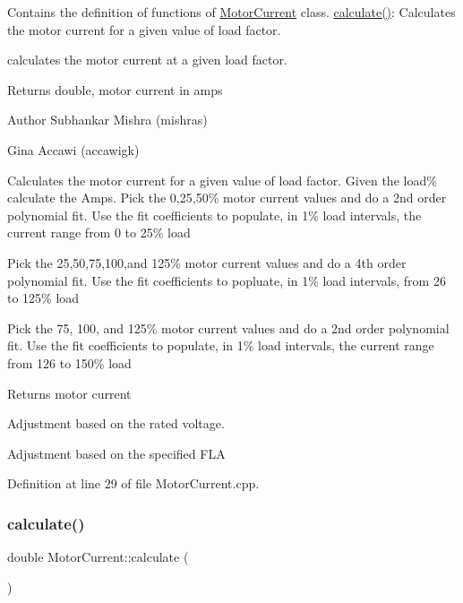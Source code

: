 Contains the definition of functions of \hyperlink{class_motor_current}{Motor\+Current} class. \hyperlink{class_motor_current_a18e545d2c82f1fe247cc501eda2ce857}{calculate()}\+: Calculates the motor current for a given value of load factor. 

calculates the motor current at a given load factor. \begin{DoxyReturn}{Returns}
double, motor current in amps
\end{DoxyReturn}
\begin{DoxyAuthor}{Author}
Subhankar Mishra (mishras) 

Gina Accawi (accawigk) 
\end{DoxyAuthor}
Calculates the motor current for a given value of load factor. Given the load\% calculate the Amps. Pick the 0,25,50\% motor current values and do a 2nd order polynomial fit. Use the fit coefficients to populate, in 1\% load intervals, the current range from 0 to 25\% load

Pick the 25,50,75,100,and 125\% motor current values and do a 4th order polynomial fit. Use the fit coefficients to popluate, in 1\% load intervals, from 26 to 125\% load

Pick the 75, 100, and 125\% motor current values and do a 2nd order polynomial fit. Use the fit coefficients to populate, in 1\% load intervals, the current range from 126 to 150\% load \begin{DoxyReturn}{Returns}
motor current 
\end{DoxyReturn}
Adjustment based on the rated voltage.

Adjustment based on the specified F\+LA 

Definition at line 29 of file Motor\+Current.\+cpp.

\mbox{\label{class_motor_current_a18e545d2c82f1fe247cc501eda2ce857}} 
\subsubsection{\texorpdfstring{calculate()}{calculate()}\hspace{0.1cm}{\footnotesize\ttfamily [2/3]}}
{\footnotesize\ttfamily double Motor\+Current\+::calculate (\begin{DoxyParamCaption}{ }\end{DoxyParamCaption})}

